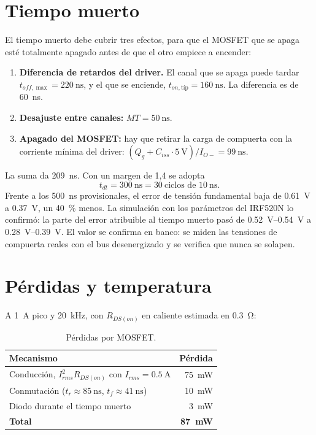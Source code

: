 \documentclass[10pt,twocolumn,letterpaper]{article}
\begin{document}
\section{Tiempo muerto}
El tiempo muerto debe cubrir tres efectos, para que el MOSFET que se apaga esté totalmente apagado antes de que el otro empiece a encender:
\begin{enumerate}[leftmargin=*]
\item \textbf{Diferencia de retardos del driver.} El canal que se apaga puede tardar $t_{off,\max}=\SI{220}{\nano\second}$, y el que se enciende, $t_{on,\text{típ}}=\SI{160}{\nano\second}$. La diferencia es de \SI{60}{\nano\second}.
\item \textbf{Desajuste entre canales:} $MT=\SI{50}{\nano\second}$.
\item \textbf{Apagado del MOSFET:} hay que retirar la carga de compuerta con la corriente mínima del driver: $(Q_g+C_{iss}\cdot\SI{5}{\volt})/I_{O-}=\SI{99}{\nano\second}$.
\end{enumerate}
La suma da \SI{209}{\nano\second}. Con un margen de 1,4 se adopta
\begin{equation}
t_{dt}=\SI{300}{\nano\second}=30\ \text{ciclos de } \SI{10}{\nano\second}.
\end{equation}
Frente a los \SI{500}{\nano\second} provisionales, el error de tensión fundamental baja de \SI{0,61}{\volt} a \SI{0,37}{\volt}, un \SI{40}{\percent} menos. La simulación con los parámetros del IRF520N lo confirmó: la parte del error atribuible al tiempo muerto pasó de \SIrange{0,52}{0,54}{\volt} a \SIrange{0,28}{0,39}{\volt}. El valor se confirma en banco: se miden las tensiones de compuerta reales con el bus desenergizado y se verifica que nunca se solapen.

\section{Pérdidas y temperatura}
A \SI{1}{\ampere} pico y \SI{20}{\kilo\hertz}, con $R_{DS(on)}$ en caliente estimada en \SI{0,3}{\ohm}:

\begin{table}[!h]
\centering
\caption{Pérdidas por MOSFET.}
\label{tab:perdidas}
\footnotesize
\begin{tabular}{@{}lr@{}}
\toprule
Mecanismo & Pérdida \\
\midrule
Conducción, $I_{rms}^2R_{DS(on)}$ con $I_{rms}=\SI{0,5}{\ampere}$ & \SI{75}{\milli\watt} \\
Conmutación ($t_r\approx\SI{85}{\nano\second}$, $t_f\approx\SI{41}{\nano\second}$) & \SI{10}{\milli\watt} \\
Diodo durante el tiempo muerto & \SI{3}{\milli\watt} \\
\midrule
\textbf{Total} & \textbf{\SI{87}{\milli\watt}} \\
\bottomrule
\end{tabular}
\end{table}
\end{document}
